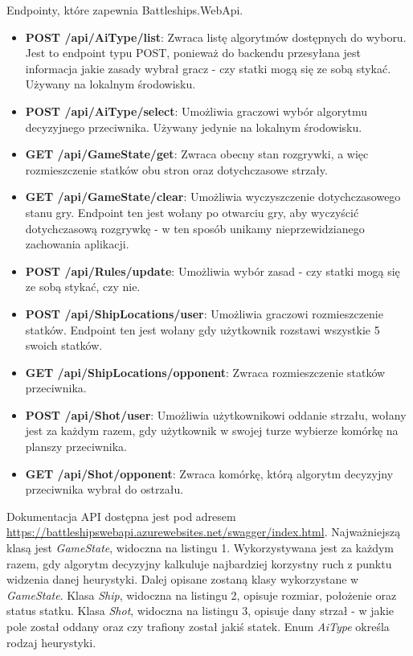 Endpointy, które zapewnia Battleships.WebApi.
\begin{itemize}
    \item \textbf{POST /api/AiType/list}: Zwraca listę algorytmów dostępnych do wyboru. Jest to endpoint typu POST, ponieważ do backendu przesyłana jest informacja jakie zasady wybrał gracz - czy statki mogą się ze sobą stykać. Używany na lokalnym środowisku.
    \item \textbf{POST /api/AiType/select}: Umożliwia graczowi wybór algorytmu decyzyjnego przeciwnika. Używany jedynie na lokalnym środowisku.
    \item \textbf{GET /api/GameState/get}: Zwraca obecny stan rozgrywki, a więc rozmieszczenie statków obu stron oraz dotychczasowe strzały.
    \item \textbf{GET /api/GameState/clear}: Umożliwia wyczyszczenie dotychczasowego stanu gry. Endpoint ten jest wołany po otwarciu gry, aby wyczyścić dotychczasową rozgrywkę - w ten sposób unikamy nieprzewidzianego zachowania aplikacji.
    \item \textbf{POST /api/Rules/update}: Umożliwia wybór zasad - czy statki mogą się ze sobą stykać, czy nie.
    \item \textbf{POST /api/ShipLocations/user}: Umożliwia graczowi rozmieszczenie statków. Endpoint ten jest wołany gdy użytkownik rozstawi wszystkie 5 swoich statków.
    \item \textbf{GET /api/ShipLocations/opponent}: Zwraca rozmieszczenie statków przeciwnika.
    \item \textbf{POST /api/Shot/user}: Umożliwia użytkownikowi oddanie strzału, wołany jest za każdym razem, gdy użytkownik w swojej turze wybierze komórkę na planszy przeciwnika.
    \item \textbf{GET /api/Shot/opponent}: Zwraca komórkę, którą algorytm decyzyjny przeciwnika wybrał do ostrzału.
\end{itemize}

Dokumentacja API dostępna jest pod adresem \url{https://battleshipswebapi.azurewebsites.net/swagger/index.html}.
\newline \newline
Najważniejszą klasą jest \emph{GameState}, widoczna na listingu 1. Wykorzystywana jest za każdym razem, gdy algorytm decyzyjny kalkuluje najbardziej korzystny ruch z punktu widzenia danej heurystyki. Dalej opisane zostaną klasy wykorzystane w \emph{GameState}. Klasa \emph{Ship}, widoczna na listingu 2, opisuje rozmiar, położenie oraz status statku. Klasa \emph{Shot}, widoczna na listingu 3, opisuje dany strzał - w jakie pole został oddany oraz czy trafiony został jakiś statek. Enum \emph{AiType} określa rodzaj heurystyki.

